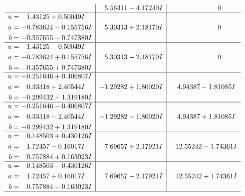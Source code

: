 \documentclass[1p]{elsarticle_modified}
\theoremstyle{definition}
\begin{document}
$$\begin{array}{c|c|c}
 & \phantom{-}5.56411 - 4.17240 I & \phantom{-0.000000 } 0 \\ \hline\begin{aligned}
u &= \phantom{-}1.43125 + 0.50049 I \\
a &= -0.783624 - 0.155756 I \\
b &= -0.357655 - 0.747380 I\end{aligned}
 & \phantom{-}5.30313 + 2.18170 I & \phantom{-0.000000 } 0 \\ \hline\begin{aligned}
u &= \phantom{-}1.43125 - 0.50049 I \\
a &= -0.783624 + 0.155756 I \\
b &= -0.357655 + 0.747380 I\end{aligned}
 & \phantom{-}5.30313 - 2.18170 I & \phantom{-0.000000 } 0 \\ \hline\begin{aligned}
u &= -0.251646 + 0.406807 I \\
a &= \phantom{-}0.33318 + 2.40544 I \\
b &= -0.299432 - 1.319180 I\end{aligned}
 & -1.29282 + 1.80020 I & \phantom{-}4.94387 - 1.81085 I \\ \hline\begin{aligned}
u &= -0.251646 - 0.406807 I \\
a &= \phantom{-}0.33318 - 2.40544 I \\
b &= -0.299432 + 1.319180 I\end{aligned}
 & -1.29282 - 1.80020 I & \phantom{-}4.94387 + 1.81085 I \\ \hline\begin{aligned}
u &= \phantom{-}0.148503 + 0.430126 I \\
a &= \phantom{-}1.72457 - 0.16017 I \\
b &= \phantom{-}0.757884 + 0.163023 I\end{aligned}
 & \phantom{-}7.69657 + 2.17921 I & \phantom{-}12.55242 - 1.74361 I \\ \hline\begin{aligned}
u &= \phantom{-}0.148503 - 0.430126 I \\
a &= \phantom{-}1.72457 + 0.16017 I \\
b &= \phantom{-}0.757884 - 0.163023 I\end{aligned}
 & \phantom{-}7.69657 - 2.17921 I & \phantom{-}12.55242 + 1.74361 I\\
 \hline 
 \end{array}$$\newpage$$\begin{array}{c|c|c}  

\end{array}$$
\end{document}
